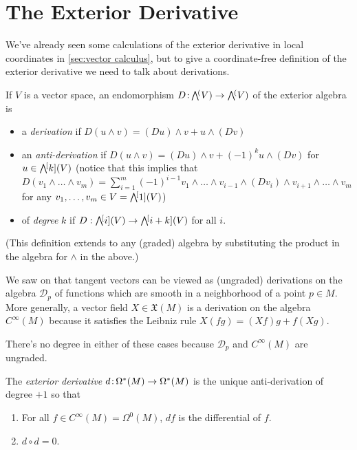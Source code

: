 
\section{The Exterior Derivative}

We've already seen some calculations of the exterior derivative in local coordinates in \cref{sec:vector calculus}, but to give a coordinate-free definition of the exterior derivative we need to talk about derivations.

\begin{definition}\label{def:derivation}
	If $V$ is a vector space, an endomorphism $D\from \ext(V) \to \ext(V)$ of the exterior algebra is
	\begin{itemize}
		\item a \emph{derivation} if $D(u \wedge v) = (Du) \wedge v + u \wedge (Dv)$
		\item an \emph{anti-derivation} if $D(u\wedge v) = (Du) \wedge v + (-1)^k u \wedge (Dv)$ for $u \in \ext[k](V)$ (notice that this implies that $D(v_1 \wedge \dots \wedge v_m) = \sum_{i=1}^m (-1)^{i-1} v_1 \wedge \dots \wedge v_{i-1} \wedge (D v_i) \wedge v_{i+1} \wedge \dots \wedge v_m$ for any $v_1, \dots , v_m \in V = \ext[1](V)$)
		\item of \emph{degree} $k$ if $D: \ext[i](V) \to \ext[i+k](V)$ for all $i$.
	\end{itemize}
	(This definition extends to any (graded) algebra by substituting the product in the algebra for $\wedge$ in the above.)
\end{definition}

\begin{example}
	We saw on  that tangent vectors can be viewed as (ungraded) derivations on the algebra $\mathcal{D}_p$ of functions which are smooth in a neighborhood of a point $p \in M$. More generally, a vector field $X \in \mathfrak{X}(M)$ is a derivation on the algebra $C^\infty(M)$ because it satisfies the Leibniz rule $X(fg) = (Xf)g + f(Xg)$.
	
	There's no degree in either of these cases because $\mathcal{D}_p$ and $C^\infty(M)$ are ungraded.
\end{example}

\begin{definition}\label{def:exterior derivative}
	The \emph{exterior derivative} $d \colon\thinspace\!\! \Omega^\ast(M) \to \Omega^\ast(M)$ is the unique anti-derivation of degree $+1$ so that
	\begin{enumerate}
		\item \label{it:d_0 is differential} For all $f \in C^\infty(M) = \Omega^0(M)$, $df$ is the differential of $f$.
		\item \label{it:d^2=0} $d \circ d = 0$.
	\end{enumerate}
\end{definition}

